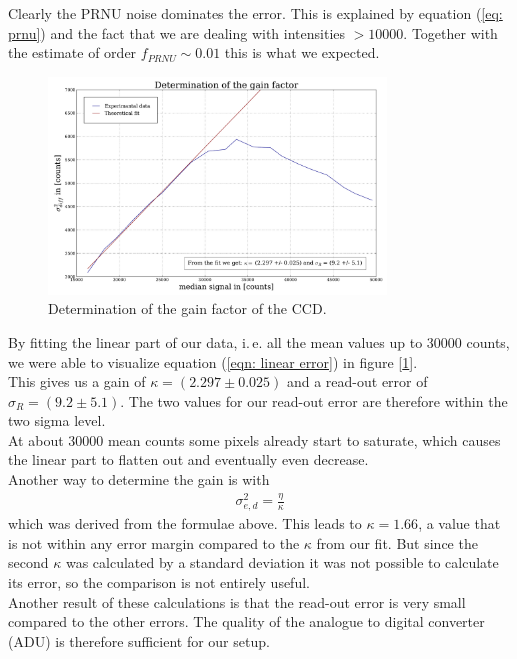 Clearly the PRNU noise dominates the error. This is explained by equation (\ref{eq: prnu}) and the fact that we are dealing with
intensities $> 10000$. Together with the estimate of order $f_{PRNU} \sim 0.01$ this is what we expected.

\begin{figure}[H]
	\centering
	\includegraphics[width=0.8\textwidth]{figures/Plots/gain}	
	\caption{Determination of the gain factor of the CCD.}
	\label{fig: gain factor}
\end{figure}

By fitting the linear part of our data, i.\,e. all the mean values up to 30000 counts, we were able to visualize equation (\ref{eqn: linear error}) in figure [\ref{fig: gain factor}]. \\

This gives us a gain of $\kappa = (2.297 \pm 0.025)$ and a read-out error of 
$\sigma_R = (9.2 \pm 5.1)$. The two values for our read-out error are therefore within the two sigma level. \\
At about 30000 mean counts some pixels already start to saturate, which causes the linear part to flatten out and eventually even decrease. \\

Another way to determine the gain is with 
\begin{align}
\sigma_{e, d}^2 = \frac{\eta}{\kappa} \label{eqn: kappa}
\end{align}
which was derived from the formulae above. This leads to $\kappa = 1.66$, a value that is not within any error margin
compared to the $\kappa$ from our fit. But since the second $\kappa$ was calculated by a standard deviation it was not possible to 
calculate its error, so the comparison is not entirely useful.\\

Another result of these calculations is that the read-out error is very small compared to the other errors. The quality of 
the analogue to digital converter (ADU) is therefore sufficient for our setup.